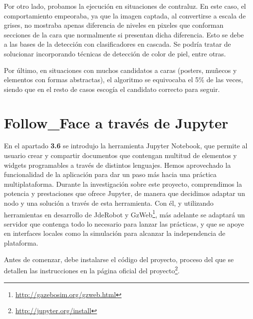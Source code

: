 Por otro lado, probamos la ejecución en situaciones de contraluz. En este caso, el comportamiento empeoraba, ya que la imagen captada, al convertirse a escala de grises, no mostraba apenas diferencia de niveles en pixeles que conforman secciones de la cara que normalmente si presentan dicha diferencia. Esto se debe a las bases de la detección con clasificadores en cascada. Se podría tratar de solucionar incorporando técnicas de detección de color de piel, entre otras.

Por último, en situaciones con muchos candidatos a caras (posters, muñecos y elementos con formas abstractas), el algoritmo se equivocaba el 5\% de las veces, siendo que en el resto de casos escogía el candidato correcto para seguir.

\section{Follow\_Face a través de Jupyter}
En el apartado \textbf{3.6} se introdujo la herramienta Jupyter Notebook,  que permite al usuario crear y compartir documentos que contengan multitud de elementos y widgets programables a través de distintos lenguajes. Hemos aprovechado la funcionalidad de la aplicación para dar un paso más hacia una práctica multiplataforma.
Durante la investigación sobre este proyecto, comprendimos la potencia y prestaciones que ofrece Jupyter, de manera que decidimos adaptar un nodo y una solución a través de esta herramienta. Con él, y utilizando herramientas en desarrollo de JdeRobot y GzWeb\footnote{\url{http://gazebosim.org/gzweb.html}}, más adelante se adaptará un servidor que contenga todo lo necesario para lanzar las prácticas, y que se apoye en interfaces locales como la simulación para alcanzar la independencia de plataforma.

Antes de comenzar, debe instalarse el código del proyecto, proceso del que se detallen las instrucciones en la página oficial del proyecto\footnote{\url{http://jupyter.org/install}}.

